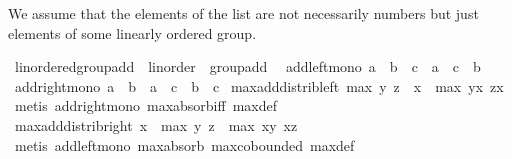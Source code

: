 \begin{isabellebody}
\begin{isamarkuptext}
We assume that the elements of the list are not necessarily numbers but just elements
of some linearly ordered group.%
\end{isamarkuptext}\isamarkuptrue%
\isamarkupfalse%
\ linordered{\isacharunderscore}{\kern0pt}group{\isacharunderscore}{\kern0pt}add\ {\isacharequal}{\kern0pt}\ linorder\ {\isacharplus}{\kern0pt}\ group{\isacharunderscore}{\kern0pt}add\ {\isacharplus}{\kern0pt}\isanewline
{}\ add{\isacharunderscore}{\kern0pt}left{\isacharunderscore}{\kern0pt}mono{\isacharcolon}{\kern0pt}\ {\isachardoublequoteopen}a\ {\isasymle}\ b\ {\isasymLongrightarrow}\ c\ {\isacharplus}{\kern0pt}\ a\ {\isasymle}\ c\ {\isacharplus}{\kern0pt}\ b{\isachardoublequoteclose}\isanewline
{}\ add{\isacharunderscore}{\kern0pt}right{\isacharunderscore}{\kern0pt}mono{\isacharcolon}{\kern0pt}\ {\isachardoublequoteopen}a\ {\isasymle}\ b\ {\isasymLongrightarrow}\ a\ {\isacharplus}{\kern0pt}\ c\ {\isasymle}\ b\ {\isacharplus}{\kern0pt}\ c{\isachardoublequoteclose}\isanewline
{}\isanewline
\isanewline
{}\isamarkupfalse%
\ max{\isacharunderscore}{\kern0pt}add{\isacharunderscore}{\kern0pt}distrib{\isacharunderscore}{\kern0pt}left{\isacharcolon}{\kern0pt}\ {\isachardoublequoteopen}max\ y\ z\ {\isacharplus}{\kern0pt}\ x\ {\isacharequal}{\kern0pt}\ max\ {\isacharparenleft}{\kern0pt}y{\isacharplus}{\kern0pt}x{\isacharparenright}{\kern0pt}\ {\isacharparenleft}{\kern0pt}z{\isacharplus}{\kern0pt}x{\isacharparenright}{\kern0pt}{\isachardoublequoteclose}\isanewline
%
\isadelimproof
%
\endisadelimproof
%
\isatagproof
{}\isamarkupfalse%
\ {\isacharparenleft}{\kern0pt}metis\ add{\isacharunderscore}{\kern0pt}right{\isacharunderscore}{\kern0pt}mono\ max{\isachardot}{\kern0pt}absorb{\isacharunderscore}{\kern0pt}iff{}\ max{\isacharunderscore}{\kern0pt}def{\isacharparenright}{\kern0pt}%
\endisatagproof
{\isafoldproof}%
%
\isadelimproof
\isanewline
%
\endisadelimproof
\isanewline
{}\isamarkupfalse%
\ max{\isacharunderscore}{\kern0pt}add{\isacharunderscore}{\kern0pt}distrib{\isacharunderscore}{\kern0pt}right{\isacharcolon}{\kern0pt}\ {\isachardoublequoteopen}x\ {\isacharplus}{\kern0pt}\ max\ y\ z\ {\isacharequal}{\kern0pt}\ max\ {\isacharparenleft}{\kern0pt}x{\isacharplus}{\kern0pt}y{\isacharparenright}{\kern0pt}\ {\isacharparenleft}{\kern0pt}x{\isacharplus}{\kern0pt}z{\isacharparenright}{\kern0pt}{\isachardoublequoteclose}\isanewline
%
\isadelimproof
%
\endisadelimproof
%
\isatagproof
{}\isamarkupfalse%
\ {\isacharparenleft}{\kern0pt}metis\ add{\isacharunderscore}{\kern0pt}left{\isacharunderscore}{\kern0pt}mono\ max{\isachardot}{\kern0pt}absorb{}\ max{\isachardot}{\kern0pt}cobounded{}\ max{\isacharunderscore}{\kern0pt}def{\isacharparenright}{\kern0pt}%

\end{isabellebody}
